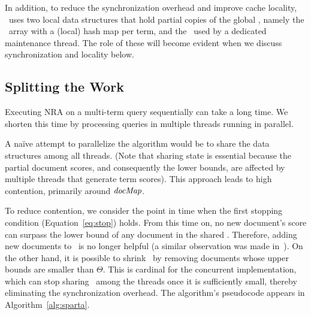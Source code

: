 In addition, to reduce the synchronization overhead and improve cache locality, \alg\ uses 
two local data structures that hold partial copies of the global \DMap, namely the \TMap\ array with a (local) hash map per term, 
and the \LDMap\ used by a dedicated maintenance thread. The role of these will become evident 
when we discuss synchronization and locality below.

\subsection{Splitting the Work}
\label{sssec:tasks}

Executing NRA on a multi-term query sequentially can take a long time. We shorten this time by processing queries in multiple threads running in parallel. 

A na\"ive attempt to parallelize the algorithm would be to 
share the data structures among all threads. (Note that sharing state is essential because the partial document scores, and consequently the lower bounds, are affected by multiple threads that generate term scores). This approach 
leads to high contention, primarily around $\textit{docMap}$.%

To reduce contention, we 
consider the point in time when the first stopping condition (Equation~\ref{eq:stop}) holds. From this time on, no new document's score can surpass the lower bound of any document in the shared \DHeap. Therefore, adding new documents to \DMap\ is no longer helpful (a similar observation was made  in~\cite{Mamoulis:2007}). 
On the other hand, it is possible to shrink \DMap\ by removing documents whose upper bounds are smaller than $\Theta$.
This is cardinal for the concurrent implementation, which can stop sharing \DMap\ among the threads once it is sufficiently small, thereby eliminating the synchronization overhead. 
The algorithm's pseudocode appears in Algorithm~\ref{alg:sparta}. 


